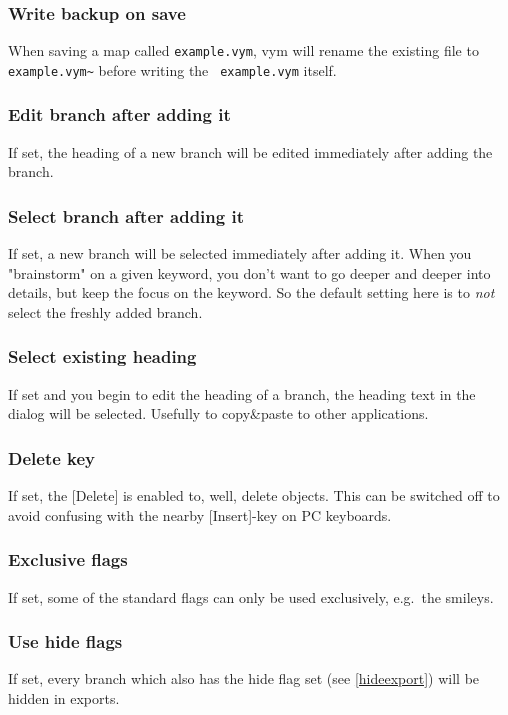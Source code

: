 \documentclass[12pt,a4paper]{article}
\newcommand{\vym}{{\sc vym }}
\newcommand{\key}[1]{[#1]}
\begin{document}
\begin{appendix}
\subsubsection*{Write backup on save}
    When saving a map called {\tt example.vym}, \vym will rename the
    existing file to {\tt example.vym\~{}} before writing the {\tt
    example.vym} itself.

\subsubsection*{Edit branch after adding it}
    If set, the heading of a new branch will be edited immediately after
    adding the branch.

\subsubsection*{Select branch after adding it}
    If set, a new branch will be selected immediately after adding it.
    When you "brainstorm" on a given keyword, you don't want to go
    deeper and deeper into details, but keep the focus on the keyword.
    So the default setting here is to {\em not} select the freshly added
    branch.
    
\subsubsection*{Select existing heading}
    If set and you begin to edit the heading of a branch, the heading
    text in the dialog will be selected. Usefully to copy\&paste to
    other applications.

\subsubsection*{Delete key}
    If set, the \key{Delete} is enabled to, well, delete objects. This
    can be switched off to avoid confusing with the nearby
    \key{Insert}-key on PC keyboards.

\subsubsection*{Exclusive flags}
    If set, some of the standard flags can only be used exclusively,
    e.g.~the smileys.

\subsubsection*{Use hide flags}
    If set, every branch which also has the hide flag set (see
    \ref{hideexport}) will be hidden in exports.


\end{appendix}
\end{document}

